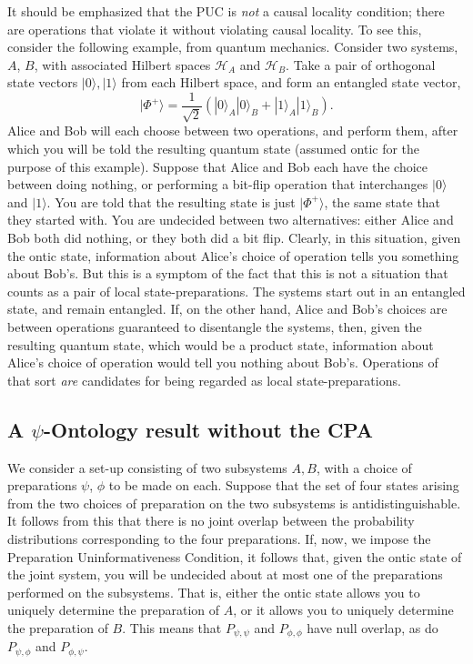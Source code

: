 \documentclass[12pt]{article}
\newcommand{\ket}[1]{|#1\rangle}
\newcommand{\mc}{\mathcal}
\begin{document}
It should be emphasized that the PUC is \emph{not} a causal locality condition; there are operations that violate it without violating causal locality.  To see this, consider the following example, from quantum mechanics.  Consider two systems, $A$, $B$, with associated Hilbert spaces $\mc{H}_A$ and $\mc{H}_B$. Take a pair of orthogonal state vectors $\ket{0}, \ket{1}$ from each Hilbert space, and form an entangled state vector,
\begin{equation}
\ket{\Phi^+} = \frac{1}{\sqrt{2}}\left(\ket{0}_A\ket{0}_B + \ket{1}_A\ket{1}_B \right).
\end{equation}
Alice and Bob will each choose between two operations, and perform them, after which you will be told the resulting quantum state (assumed ontic for the purpose of this example). Suppose that Alice and Bob each have the choice between doing nothing, or performing a bit-flip operation that interchanges $\ket{0}$ and  $\ket{1}$.  You are told that the resulting state is just $\ket{\Phi^+}$, the same state that they started with.  You are undecided between two alternatives: either Alice and Bob both did nothing, or they both did a bit flip.  Clearly, in this situation, given the ontic state, information about  Alice's choice of operation tells you something about Bob's.  But this is a symptom of the fact that this is not  a situation that counts as a pair of local state-preparations. The systems start out in an entangled state, and remain entangled. If, on the other hand, Alice and Bob's choices are between operations guaranteed to disentangle the systems, then, given the resulting quantum state, which would be a product state, information about Alice's choice of operation would tell you nothing about Bob's.  Operations of that sort \emph{are} candidates for being regarded as local state-preparations.



\subsection{A $\psi$-Ontology result without the CPA} We consider a set-up consisting of two subsystems $A, B$, with  a choice of preparations ${\psi}$, ${\phi}$ to be made on each.  Suppose that the set of four states arising from the two choices of preparation on the two subsystems is antidistinguishable. It follows from this that there is no joint overlap between the probability distributions corresponding to the four  preparations. If, now, we impose the Preparation Uninformativeness Condition, it follows that, given the ontic state of the joint system, you will be undecided about at most one of the preparations performed on the subsystems.  That is, either the ontic state allows you to uniquely determine the preparation of $A$, or it allows you to uniquely determine the preparation of $B$.  This means that  $P_{\psi, \psi}$ and $P_{\phi, \phi}$ have null overlap, as do $P_{\psi, \phi}$ and $P_{\phi, \psi}$.
\end{document}
